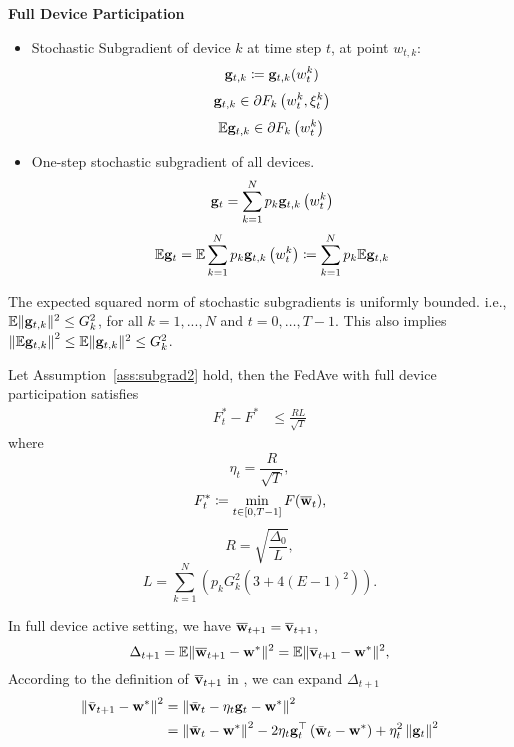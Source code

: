 

\textbf{Full Device Participation}

\begin{itemize}
	\item Stochastic Subgradient of device $k$ at time step $t$, at point $w_{t,k}$: 
	$${\mathbf{g}}_{t,k} \coloneqq {\mathbf{g}}_{t,k}(w_t^k)$$
	$$ {\mathbf{g}}_{t, k} \in \partial F_{k}\left(w_{t}^{k}, \xi_{t}^{k}\right) $$
	$$\mathbb{E} {\mathbf{g}}_{t, k} \in \partial F_{k}\left(w_{t}^{k}\right)$$
\item  One-step stochastic subgradient of all devices.
$${\mathbf{g}}_{t}=\sum_{k=1}^{N} p_{k} {\mathbf{g}}_{t, k}\left(w_{t}^{k}\right) $$
\begin{align}
	\mathbb{E} {\mathbf{g}}_{t}= \mathbb{E} \sum_{k=1}^{N} p_{k} {\mathbf{g}}_{t, k}\left(w_{t}^{k}\right) \coloneqq \sum_{k=1}^{N} p_{k} \mathbb{E} {\mathbf{g}}_{t, k}
	\label{eq:egt}
\end{align}
\end{itemize}

\begin{assumption}
The expected squared norm of stochastic subgradients is uniformly bounded. i.e.,
$\mathbb{E}\|{\mathbf{g}}_{t,k}\|^2  \leq G_k^{2}$, for all $k = 1,..., N$ and $t=0, \dots, T-1$.  This also implies $\left\| \mathbb{E}{\mathbf{g}}_{t,k}\right\|^2  \leq \mathbb{E}\|{\mathbf{g}}_{t,k}\|^2 \leq G_k^2$.
\label{ass:subgrad2}
\end{assumption}

\begin{theorem}
	Let Assumption~\ref{ass:subgrad2} hold, 
	then the FedAve with full device participation satisfies
	\begin{align}
		 F^*_t - F^* &\leq \frac{RL}{\sqrt{T}}
	\end{align}
	where $$\eta_t = \frac{R}{\sqrt{T}},$$ 
	$$F^*_t \coloneqq \min_{t \in [0, T-1]} F(\overline{{\mathbf{w}}}_t),$$
	$$R = \sqrt{ \frac{\Delta_0}{L}},$$ 
	$$L=\sum_{k=1}^N \left( p_k G_k^2 \left(3 + 4(E-1)^2\right)\right).$$ 
	\label{th:cvxnonsmoth}
\end{theorem}
{} 


In full device active setting, we have $\overline{{\mathbf{w}}}_{t+1}=\overline{{\mathbf{v}}}_{t+1}$,
$$\Delta_{t+1} = \mathbb{E} \|\overline{{\mathbf{w}}}_{t+1} - {\mathbf{w}}^*\|^2 = \mathbb{E} \|\overline{{\mathbf{v}}}_{t+1} - {\mathbf{w}}^*\|^2,$$
According to the definition of $\overline{{\mathbf{v}}}_{t+1}$ in \eq{\ref{eq:vbar}}, we can expand $\Delta_{t+1}$
$$\begin{aligned}\left\|\bar{{\mathbf{v}}}_{t+1}-{\mathbf{w}}^{*}\right\|^2 &=\left\|\bar{{\mathbf{w}}}_{t}-\eta_{t} {\mathbf{g}}_{t}-{\mathbf{w}}^{*}\right\|^2 \\ &=\left\|\bar{{\mathbf{w}}}_{t}-{\mathbf{w}}^{*}\right\|^{2}-2 \eta_{t} {\mathbf{g}}_{t}^{\top}\left(\bar{{\mathbf{w}}}_{t}-{\mathbf{w}}^{*}\right)+\eta_{t}^{2}\left\|{\mathbf{g}}_{t}\right\|^{2} \end{aligned}$$

